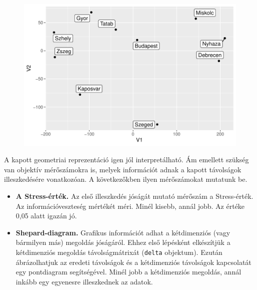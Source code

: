 \documentclass[
  letterpaper,
]{krantz}
\makeatletter
\newenvironment{Shaded}{\begin{snugshade}}{\end{snugshade}}
\newcommand{\CommentTok}[1]{\textcolor[rgb]{0.37,0.37,0.37}{#1}}
\newcommand{\NormalTok}[1]{\textcolor[rgb]{0.00,0.23,0.31}{#1}}
\newcommand{\SpecialCharTok}[1]{\textcolor[rgb]{0.37,0.37,0.37}{#1}}
\providecommand{\tightlist}{%
  \setlength{\itemsep}{0pt}\setlength{\parskip}{0pt}}\usepackage{longtable,booktabs,array}
\newenvironment{kframe}{%
\medskip{}
\setlength{\fboxsep}{.8em}
 \def\at@end@of@kframe{}%
 \ifinner\ifhmode%
  \def\at@end@of@kframe{\end{minipage}}%
  \begin{minipage}{\columnwidth}%
 \fi\fi%
 \def\FrameCommand##1{\hskip\@totalleftmargin \hskip-\fboxsep
 \colorbox{shadecolor}{##1}\hskip-\fboxsep
     \hskip-\linewidth \hskip-\@totalleftmargin \hskip\columnwidth}%
 \MakeFramed {\advance\hsize-\width
   \@totalleftmargin\z@ \linewidth\hsize
   \@setminipage}}%
 {\par\unskip\endMakeFramed%
 \at@end@of@kframe}
\renewenvironment{Shaded}{\begin{kframe}}{\end{kframe}}
\makeatother
\begin{document}
\begin{figure}[H]

{\centering \includegraphics{./sec_tobbdimenzios_skalazas_files/figure-pdf/unnamed-chunk-12-1.pdf}

}

\end{figure}

A kapott geometriai reprezentáció igen jól interpretálható. Ám emellett
szükség van objektív mérőszámokra is, melyek információt adnak a kapott
távolságok illeszkedésére vonatkozóan. A következőkben ilyen
mérőszámokat mutatunk be.

\begin{itemize}
\tightlist
\item
  \textbf{A Stress-érték.} Az első illeszkedés jóságát mutató mérőszám a
  Stress-érték. Az információveszteség mértékét méri. Minél kisebb,
  annál jobb. Az értéke 0,05 alatt igazán jó.
\end{itemize}

\begin{Shaded}
\end{Shaded}

\begin{itemize}
\tightlist
\item
  \textbf{Shepard-diagram.} Grafikus információt adhat a kétdimenziós
  (vagy bármilyen más) megoldás jóságáról. Ehhez első lépésként
  elkészítjük a kétdimenziós megoldás távolságmátrixát (\texttt{delta}
  objektum). Ezután ábrázolhatjuk az eredeti távolságok és a
  kétdimenziós távolságok kapcsolatát egy pontdiagram segítségével.
  Minél jobb a kétdimenziós megoldás, annál inkább egy egyenesre
  illeszkednek az adatok.
\end{itemize}
\end{document}
